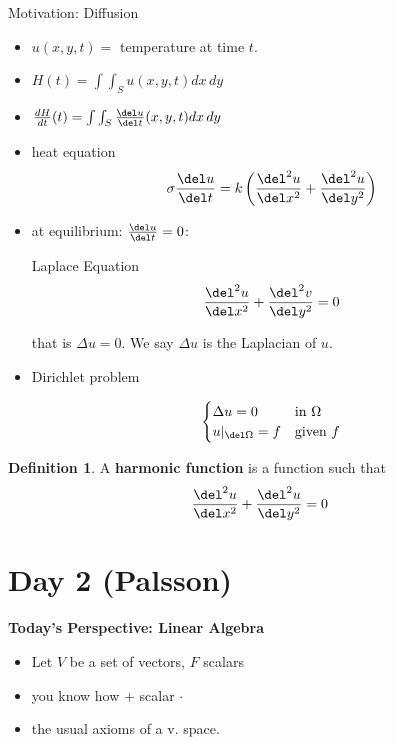 \documentclass[a5paper]{article}
\theoremstyle{definition}%
\newtheorem*{definition*}{Definition}
\numberwithin{exercise}{section}
\theoremstyle{remark}%
\begin{document}
Motivation: Diffusion
\begin{itemize}
\item $u(x,y,t)=$ temperature at time $t$. 

\item $H(t)=\int\int_S u(x,y,t) dx\, dy$

\item $\frac{dH}{dt}(t)=\int\int_S \frac{\del u}{\del t}(x,y,t) dx\, dy$

\item heat equation
\[
\sigma\frac{\del u}{\del t}=k\left(\frac{\del^2 u}{\del x^2}+\frac{\del^2 u}{\del y^2}\right)
\]

\item at equilibrium: $\frac{\del u}{\del t}=0$:

Laplace Equation
\[\frac{\del^2 u}{\del x^2}+\frac{\del^2 v}{\del y^2}=0\]

that is $\Delta u=0$. We say $\Delta u$ is the Laplacian of $u$.


\item Dirichlet problem

\[\begin{cases}
\Delta u = 0 & \text{in } \Omega\\
u|_{\del \Omega} = f & \text{given } f
\end{cases}\]

\end{itemize}

\begin{highlight}
\begin{definition*}
A \textbf{harmonic function} is a function such that 
$$\frac{\del^2 u}{\del x^2}+\frac{\del^2 u}{\del y^2}=0$$
\end{definition*}
\end{highlight}

\section{Day 2 (Palsson)}

\textbf{Today's Perspective: Linear Algebra}

\begin{itemize}
\item Let $V$ be a set of vectors, $F$ scalars
\item you know how $+$ scalar $\cdot$
\item the usual axioms of a v. space. 
\end{itemize}
\end{document}
